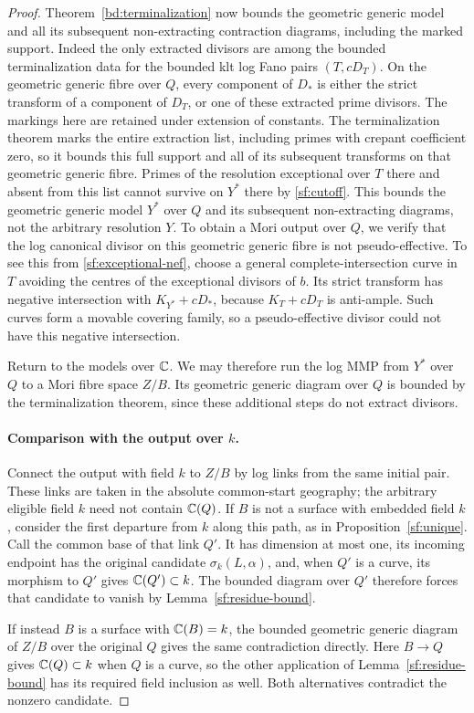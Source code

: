 \begin{proof}
Theorem~\ref{bd:terminalization} now bounds the geometric generic
model and all its subsequent non-extracting contraction diagrams,
including the marked support.  Indeed the only extracted divisors
are among the bounded terminalization data for the bounded klt log
Fano pairs $(T,cD_T)$.  On the geometric generic fibre over $Q$,
every component of $D_*$ is either the strict transform of a component
of $D_T$, or one of these extracted prime divisors.  The markings here
are retained under extension of constants.  The terminalization
theorem marks the entire extraction list, including primes with
crepant coefficient zero, so it bounds this full support and all of
its subsequent transforms on that geometric generic fibre.  Primes
of the resolution exceptional over $T$ there and absent from this
list cannot survive on $Y^*$ there by \eqref{sf:cutoff}.
This bounds the geometric generic model $Y^*$ over $Q$ and its
subsequent non-extracting diagrams, not the arbitrary resolution $Y$.
To obtain a Mori output over $Q$, we verify
that the log canonical divisor on this geometric generic fibre is not
pseudo-effective.  To see this from \eqref{sf:exceptional-nef}, choose
a general complete-intersection curve in $T$ avoiding the centres
of the exceptional divisors of $b$.  Its strict transform has
negative intersection with $K_{Y^*}+cD_*$, because $K_T+cD_T$ is
anti-ample.  Such curves form a movable covering family, so a
pseudo-effective divisor could not have this negative intersection.

Return to the models over $\mathbb C$.  We may therefore run the log MMP
from $Y^*$ over $Q$ to a Mori fibre space $Z/B$.  Its geometric
generic diagram over $Q$ is bounded by the terminalization theorem,
since these additional steps do not extract divisors.

\paragraph{Comparison with the output over $k$.}
Connect the output with field $k$ to $Z/B$ by log links from the same
initial pair.  These links are taken in the absolute common-start
geography; the arbitrary eligible field $k$ need not contain $\mathbb C(Q)$.
If $B$ is not a surface with embedded field $k$, consider the first
departure from $k$ along this path, as in Proposition~\ref{sf:unique}.
Call the common base of that link $Q'$.  It has dimension at most one,
its incoming endpoint has the original candidate $\sigma_k(L,\alpha)$,
and, when $Q'$ is a curve, its morphism to $Q'$ gives
$\mathbb C(Q')\subset k$.  The bounded diagram over $Q'$ therefore forces
that candidate to vanish by Lemma~\ref{sf:residue-bound}.

If instead $B$ is a surface with $\mathbb C(B)=k$, the bounded geometric
generic diagram of $Z/B$
over the original $Q$ gives the same contradiction directly.  Here
$B\to Q$ gives $\mathbb C(Q)\subset k$ when $Q$ is a curve, so the other
application of Lemma~\ref{sf:residue-bound} has its required field
inclusion as well.  Both alternatives contradict the nonzero candidate.
\end{proof}

